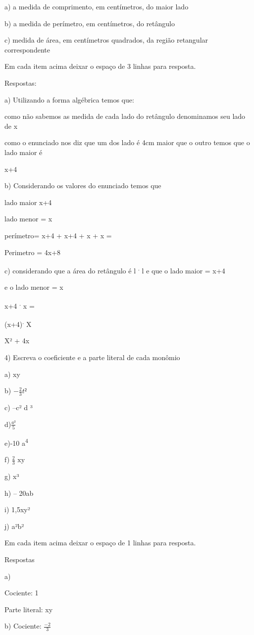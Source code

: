 {a) a medida de comprimento, em centímetros, do maior lado

b) a medida de perímetro, em centímetros, do retângulo

c) medida de área, em centímetros quadrados, da região retangular
correspondente

Em cada item acima deixar o espaço de 3 linhas para resposta.

Respostas:

a) Utilizando a forma algébrica temos que:

como não sabemos as medida de cada lado do retângulo denominamos seu
lado de x

como o enunciado nos diz que um dos lado é 4cm maior que o outro temos
que o lado maior é

x+4

b) Considerando os valores do enunciado temos que

lado maior x+4

lado menor = x

perímetro= x+4 + x+4 + x + x =

Perimetro = 4x+8

c) considerando que a área do retângulo é l \textsuperscript{.} l e que
o lado maior = x+4

e o lado menor = x

x+4 \textsuperscript{.} x =

(x+4)\textsuperscript{.} X

X² + 4x

4) Escreva o coeficiente e a parte literal de cada monômio

a) xy

b) \(- \frac{2}{3}t²\)

c) --c² d ³

d)\(\frac{a²}{5}\)

e)-10 a\textsuperscript{4}

f) \(\frac{2}{3}\text{\ xy}\)

g) x³

h) -- 20ab

i) 1,5xy²

j) a²b²

Em cada item acima deixar o espaço de 1 linhas para resposta.

Respostas

a)

Cociente: 1

Parte literal: xy

b) Cociente: \(\frac{- 2}{3}\)

}

